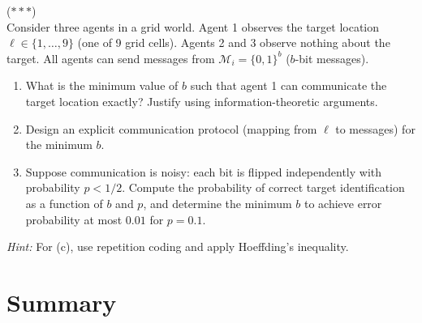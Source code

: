 \documentclass[11pt,a4paper]{article}
\begin{document}
\begin{exercise}
\textnormal{(\(***\))} \\
Consider three agents in a grid world.  Agent 1 observes the
target location $\ell \in \{1, \ldots, 9\}$ (one of 9 grid
cells).  Agents 2 and 3 observe nothing about the target.  All
agents can send messages from $\mathcal{M}_i = \{0, 1\}^b$
($b$-bit messages).
\begin{enumerate}[nosep,label=(\alph*)]
  \item What is the minimum value of $b$ such that agent 1 can
    communicate the target location exactly?  Justify using
    information-theoretic arguments.
  \item Design an explicit communication protocol (mapping from
    $\ell$ to messages) for the minimum $b$.
  \item Suppose communication is noisy: each bit is flipped
    independently with probability $p < 1/2$.  Compute the
    probability of correct target identification as a function
    of $b$ and $p$, and determine the minimum $b$ to achieve
    error probability at most $0.01$ for $p = 0.1$.
\end{enumerate}
\textit{Hint:} For (c), use repetition coding and apply
Hoeffding's inequality.
\end{exercise}

\section{Summary}
\label{sec:summary}
\end{document}
